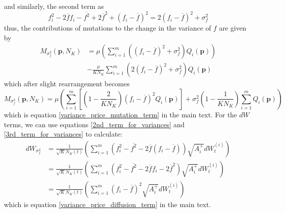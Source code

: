 and similarly, the second term as
\begin{equation*}
f^2_i - 2\overline{f}f_i -\overline{f^2}+2\overline{f}^2 + (f_i - \overline{f})^2 = 2(f_i - \overline{f})^2 + \sigma^2_f
\end{equation*}
thus, the contributions of mutations to the change in the variance of $f$ are given by
\begin{equation}
\begin{aligned}
M_{\sigma^2_f}(\mathbf{p},N_K) &= \mu\left(\sum\limits_{i=1}^{m}\left((f_i - \overline{f})^2 + \sigma^2_f\right)Q_i(\mathbf{p})\right)\\
&- \frac{\mu}{KN_K}\sum\limits_{i=1}^{m}\left(2(f_i - \overline{f})^2 + \sigma^2_f\right)Q_i(\mathbf{p}) 
\end{aligned}
\end{equation}
which after slight rearrangement becomes
\begin{equation}
M_{\sigma^2_f}(\mathbf{p},N_K) = \mu\left(\sum\limits_{i=1}^{m}\left[\left(1 - \frac{2}{KN_K}\right)(f_i - \overline{f})^2Q_i(\mathbf{p})\right] + \sigma^2_f\left(1 - \frac{1}{KN_K}\right)\sum\limits_{i=1}^{m}Q_i(\mathbf{p})\right)
\end{equation}
which is equation \eqref{variance_price_mutation_term} in the main text. For the $dW$ terms, we can use equations \eqref{2nd_term_for_variances} and \eqref{3rd_term_for_variances} to calculate:
\begin{align}
dW_{\sigma^2_{f}} &=  \frac{1}{\sqrt{K}N_{K}(t)}\left(\sum\limits_{i=1}^{m}\left(f^2_i - \overline{f^2} - 2 \overline{f}(f_i - \overline{f})\right)\sqrt{A_i^+}dW_{t}^{(i)}\right)\\
&= \frac{1}{\sqrt{K}N_{K}(t)}\left(\sum\limits_{i=1}^{m}\left(f^2_i - \overline{f^2} - 2 \overline{f}f_i - 2\overline{f}^2\right)\sqrt{A_i^+}dW_{t}^{(i)}\right)\\
&= \frac{1}{\sqrt{K}N_{K}(t)}\left(\sum\limits_{i=1}^{m}\left(f_i - \overline{f}\right)^2\sqrt{A_i^+}dW_{t}^{(i)}\right)
\end{align}
which is equation \eqref{variance_price_diffusion_term} in the main text.

